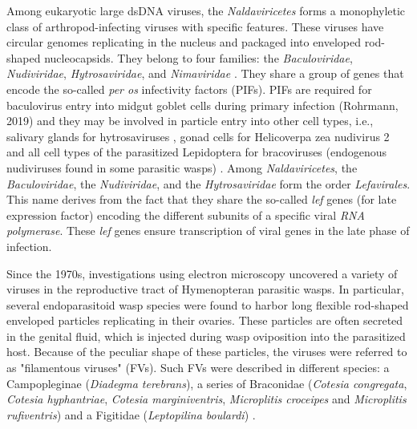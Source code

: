 Among eukaryotic large dsDNA viruses, the \textit{Naldaviricetes} forms a monophyletic class of arthropod-infecting viruses with specific features. These viruses have circular genomes replicating in the nucleus and packaged into enveloped rod-shaped nucleocapsids. They belong to four families: the \textit{Baculoviridae}, \textit{Nudiviridae}, \textit{Hytrosaviridae}, and \textit{Nimaviridae} \citep{harrison_ictv_2020}. They share a group of genes that encode the so-called \textit{per os} infectivity factors (PIFs). PIFs are required for baculovirus entry into midgut goblet cells during primary infection (Rohrmann, 2019) and they may be involved in particle entry into other cell types, i.e., salivary glands for hytrosaviruses \citep{abd-alla_genome_2008,garcia-maruniak_sequence_2008}, gonad cells for Helicoverpa zea nudivirus 2 \citep{hamm_oviposition_1996,burand_analysis_2012} and all cell types of the parasitized Lepidoptera for bracoviruses (endogenous nudiviruses found in some parasitic wasps) \citep{bezier_polydnaviruses_2009, muller_genome-wide_2021}. Among \textit{Naldaviricetes}, the \textit{Baculoviridae}, the \textit{Nudiviridae}, and the \textit{Hytrosaviridae} form the order \textit{Lefavirales}. This name derives from the fact that they share the so-called \textit{lef} genes (for late expression factor) encoding the different subunits of a specific viral \textit{RNA polymerase}. These \textit{lef} genes ensure transcription of viral genes in the late phase of infection. 

Since the 1970s, investigations using electron microscopy uncovered a variety of viruses in the reproductive tract of Hymenopteran parasitic wasps. In particular, several endoparasitoid wasp species were found to harbor long flexible rod-shaped enveloped particles replicating in their ovaries. These particles are often secreted in the genital fluid, which is injected during wasp oviposition into the parasitized host. Because of the peculiar shape of these particles, the viruses were referred to as "filamentous viruses" (FVs). Such FVs were described in different species: a Campopleginae (\textit{Diadegma terebrans}), a series of Braconidae (\textit{Cotesia congregata}, \textit{Cotesia hyphantriae}, \textit{Cotesia marginiventris}, \textit{Microplitis croceipes} and \textit{Microplitis rufiventris}) and a Figitidae (\textit{Leptopilina boulardi}) \citep{krell_replication_1987, de_buron_characterization_1992,  stoltz_viruses_1979, hamm_comparative_1990,hegazi_calyx_2005, varaldi_infectious_2003,varaldi_artifical_2006}.

